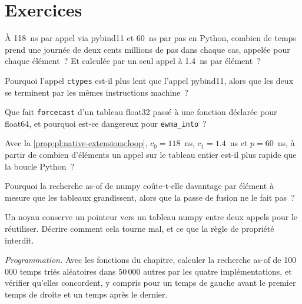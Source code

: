 \section{Exercices}

\begin{exercise}[$\star$]\label{exo:pl:native-extensions:1}
À 118~ns par appel via pybind11 et 60~ns par pas en Python, combien de temps prend une journée de deux cents millions de pas dans chaque cas,
appelée pour chaque élément~? Et calculée par un seul appel à 1.4~ns par élément~?
\end{exercise}

\begin{exercise}[$\star$]\label{exo:pl:native-extensions:2}
Pourquoi l'appel \texttt{ctypes} est-il plus lent que l'appel pybind11, alors que les deux se terminent par les mêmes instructions machine~?
\end{exercise}

\begin{exercise}[$\star$]\label{exo:pl:native-extensions:3}
Que fait \texttt{forcecast} d'un tableau float32 passé à une fonction déclarée pour float64, et pourquoi est-ce dangereux pour
\texttt{ewma\_into}~?
\end{exercise}

\begin{exercise}[$\star\star$]\label{exo:pl:native-extensions:4}
Avec la \cref{prop:pl:native-extensions:loop}, $c_0 = 118$~ns, $c_1 = 1.4$~ns et $p = 60$~ns, à partir de combien d'éléments un appel sur le
tableau entier est-il plus rapide que la boucle Python~?
\end{exercise}

\begin{exercise}[$\star\star$]\label{exo:pl:native-extensions:5}
Pourquoi la recherche as-of de numpy coûte-t-elle davantage par élément à mesure que les tableaux grandissent, alors que la passe de fusion ne le fait pas~?
\end{exercise}

\begin{exercise}[$\star\star$]\label{exo:pl:native-extensions:6}
Un noyau conserve un pointeur vers un tableau numpy entre deux appels pour le réutiliser. Décrire comment cela tourne mal, et ce que la règle de propriété interdit.
\end{exercise}

\begin{exercise}[$\star\star\star$]\label{exo:pl:native-extensions:7}
\emph{Programmation.} Avec les fonctions du chapitre, calculer la recherche as-of de 100\,000 temps triés aléatoires dans 50\,000 autres par les quatre
implémentations, et vérifier qu'elles concordent, y compris pour un temps de gauche avant le premier temps de droite et un temps après le dernier.
\end{exercise}

